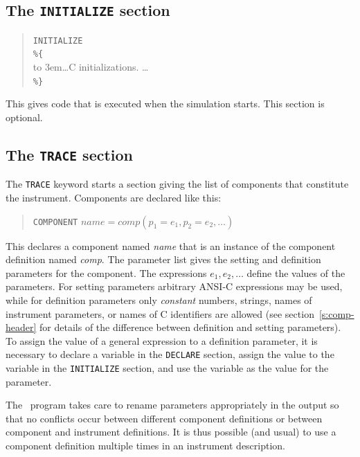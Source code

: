 \subsection{The \texttt{INITIALIZE} section}
\label{s:initialize}

\begin{quote}
  \texttt{INITIALIZE} \\
  \verb|%{| \\
  \hbox to 3em{}\ldots C initializations. \ldots \\
  \verb|%}|
\end{quote} 
This gives code that is executed when the simulation starts. This section is
optional.


\subsection{The \texttt{TRACE} section}
\label{s:trace}

The \texttt{TRACE} keyword starts a section giving the list of
components that constitute the instrument.
Components are declared like this:
\begin{quote}
  \texttt{COMPONENT} $\textit{name} =
    \textit{comp}(p_1 = e_1, p_2 = e_2, \ldots)$
\end{quote}
 
This declares a component named \textit{name} that is an instance of the
component definition named \textit{comp}. The parameter list gives the
setting and definition parameters for the component. The expressions $e_1,
e_2, \ldots$ define the values of the parameters. For setting parameters
arbitrary ANSI-C expressions may be used, while for definition parameters
only \emph{constant} numbers, strings, names of instrument parameters, or names
of C identifiers are allowed (see section~\ref{s:comp-header} for details of
the difference between definition and setting parameters). To assign the
value of a general expression to a definition parameter, it is necessary to
declare a variable in the \texttt{DECLARE} section, assign the value to the
variable in the \texttt{INITIALIZE} section, and use the variable as the
value for the parameter.

The \MCS\ program takes care to rename parameters appropriately in the
output so that no conflicts occur between different component
definitions or between component and instrument definitions. It is thus
possible (and usual) to use a component definition multiple times
in an instrument description.


